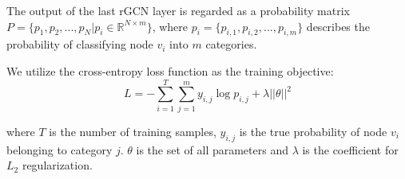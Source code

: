 The output of the last rGCN layer is regarded as a probability matrix $P=\{p_1,p_2,...,p_N|p_i\in \mathbb{R}^{N \times m}\}$, where $p_i=\{p_{i,1},p_{i,2},...,p_{i,m}\}$ describes the probability of classifying node $v_i$ into $m$ categories. 

We utilize the cross-entropy loss function as the training objective:
\begin{equation}
L=-\sum_{i=1}^T\sum_{j=1}^m y_{i,j}\log p_{i,j}+\lambda ||\theta||^2
\end{equation}

\noindent where $T$ is the number of training samples, $y_{i,j}$ is the true probability of node $v_i$ belonging to category $j$. $\theta$ is the set of all parameters and $\lambda$ is the coefficient for $L_2$  regularization.
